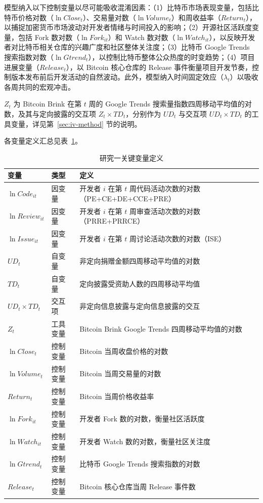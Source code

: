 \documentclass[
    type = master, %
    degree = professional,        %
    decl-page,  %
    twoside,                %
    fontset = fandol %
  ]{njuthesis}
\begin{document}
模型纳入以下控制变量以尽可能吸收混淆因素：（1）比特币市场表现变量，包括比特币价格对数（$\ln\mathit{Close}_t$）、交易量对数（$\ln\mathit{Volume}_t$）和周收益率（$\mathit{Return}_t$），以捕捉加密货币市场波动对开发者情绪与时间投入的影响；（2）开源社区活跃度变量，包括 Fork 数对数（$\ln\mathit{Fork}_{it}$）和 Watch 数对数（$\ln\mathit{Watch}_{it}$），以反映开发者对比特币相关仓库的兴趣广度和社区整体关注度；（3）比特币 Google Trends 搜索指数对数（$\ln\mathit{Gtrend}_t$），以控制比特币整体公众热度的时变趋势；（4）项目进展变量（$\mathit{Release}_t$），以 Bitcoin 核心仓库的 Release 事件衡量项目开发节奏，控制版本发布前后开发活动的自然波动。此外，模型纳入时间固定效应（$\lambda_t$）以吸收各周共同的宏观冲击。

$Z_t$ 为 Bitcoin Brink 在第 $t$ 周的 Google Trends 搜索量指数四周移动平均值的对数，及其与定向披露的交互项 $Z_t \times \mathit{TD}_t$，分别作为 $\mathit{UD}_t$ 与交互项 $\mathit{UD}_t \times \mathit{TD}_t$ 的工具变量，详见第~\ref{sec:iv-method} 节的说明。

各变量定义汇总见表~\ref{tab:variables-1}。

\begin{table}[htbp]
    \centering
    \small
    \caption{研究一关键变量定义}
    \label{tab:variables-1}
    \begin{tabularx}{\textwidth}{p{4.2cm}p{1.8cm}X}
        \toprule
        变量 & 类型 & 定义 \\
        \midrule
        $\ln\mathit{Code}_{it}$ & 因变量 & 开发者 $i$ 在第 $t$ 周代码活动次数的对数（PE+CE+DE+CCE+PRE） \\
        $\ln\mathit{Review}_{it}$ & 因变量 & 开发者 $i$ 在第 $t$ 周审查活动次数的对数（PRRE+PRRCE） \\
        $\ln\mathit{Issue}_{it}$ & 因变量 & 开发者 $i$ 在第 $t$ 周讨论活动次数的对数（ISE） \\
        $\mathit{UD}_t$ & 自变量 & 非定向捐赠金额四周移动平均值的对数 \\
        $\mathit{TD}_t$ & 自变量 & 定向披露受资助人数的四周移动平均值 \\
        $\mathit{UD}_t \times \mathit{TD}_t$ & 交互项 & 非定向信息披露与定向信息披露的交互 \\
        $Z_t$ & 工具变量 & Bitcoin Brink Google Trends 四周移动平均值的对数 \\
        $\ln\mathit{Close}_t$ & 控制变量 & Bitcoin 当周收盘价格的对数 \\
        $\ln\mathit{Volume}_t$ & 控制变量 & Bitcoin 当周交易量的对数 \\
        $\mathit{Return}_t$ & 控制变量 & Bitcoin 当周价格收益率 \\
        $\ln\mathit{Fork}_{it}$ & 控制变量 & 开发者 Fork 数的对数，衡量社区活跃度 \\
        $\ln\mathit{Watch}_{it}$ & 控制变量 & 开发者 Watch 数的对数，衡量社区关注度 \\
        $\ln\mathit{Gtrend}_t$ & 控制变量 & 比特币 Google Trends 搜索指数的对数 \\
        $\mathit{Release}_t$ & 控制变量 & Bitcoin 核心仓库当周 Release 事件数 \\
        \bottomrule
    \end{tabularx}
\end{table}
\end{document}
